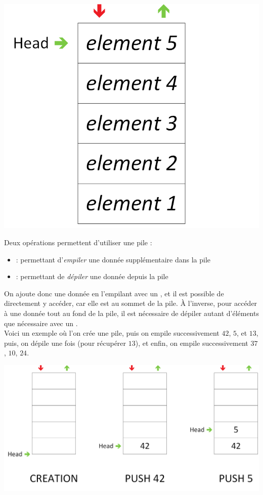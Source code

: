 \begin{center}
\includegraphics[scale=0.75]{Cours/Piles_1_Structure_Generale_centered.png}
\end{center}

\smallskip

Deux opérations permettent d'utiliser une pile :
\begin{itemize}
\item {} : permettant d'\textit{empiler} une donnée supplémentaire dans la pile
\item {} : permettant de \textit{dépiler} une donnée depuis la pile
\end{itemize}
On ajoute donc une donnée en l'empilant avec un , et il est possible de directement y accéder, car elle est au sommet de la pile.
À l'inverse, pour accéder à une donnée tout au fond de la pile, il est nécessaire de dépiler autant d'éléments que nécessaire avec un .\\

Voici un exemple où l'on crée une pile, puis on empile successivement $ 42 $, $ 5 $, et $ 13 $, puis, on dépile une fois (pour récupérer $ 13 $), et enfin, on empile successivement $ 37 $, $ 10 $, $ 24 $.\\

\begin{center}
\includegraphics[scale=0.5]{Cours/Piles_2_Structure_Generale_Usage_pack_1.png}
\end{center}

